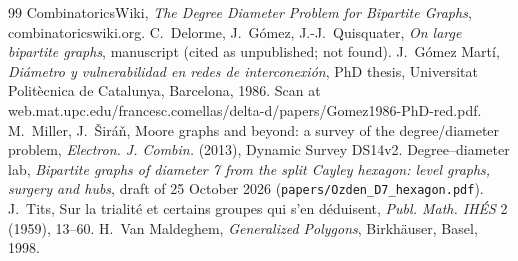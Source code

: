 \documentclass[11pt]{amsart}
\newcommand{\file}[1]{\nolinkurl{#1}}
\theoremstyle{plain}
\theoremstyle{definition}
\theoremstyle{remark}
\begin{document}
\par\endgroup

\begin{thebibliography}{99}
 CombinatoricsWiki, \emph{The Degree Diameter Problem for Bipartite Graphs},
  combinatoricswiki.org.
 C.~Delorme, J.~Gómez, J.-J.~Quisquater, \emph{On large bipartite graphs}, manuscript (cited as
  unpublished; not found).
 J.~Gómez Martí, \emph{Diámetro y vulnerabilidad en redes de interconexión}, PhD thesis, Universitat
  Politècnica de Catalunya, Barcelona, 1986. Scan at web.mat.upc.edu/francesc.comellas/delta-d/papers/Gomez1986-PhD-red.pdf.
 M.~Miller, J.~Širáň, Moore graphs and beyond: a survey of the degree/diameter problem,
  \emph{Electron. J. Combin.} (2013), Dynamic Survey DS14v2.
 Degree--diameter lab, \emph{Bipartite graphs of diameter 7 from the split Cayley hexagon: level graphs,
  surgery and hubs}, draft of 25 October 2026 (\file{papers/Ozden_D7_hexagon.pdf}).
 J.~Tits, Sur la trialité et certains groupes qui s'en déduisent, \emph{Publ. Math. IHÉS} 2 (1959),
  13--60.
 H.~Van Maldeghem, \emph{Generalized Polygons}, Birkhäuser, Basel, 1998.
\end{thebibliography}
\end{document}
